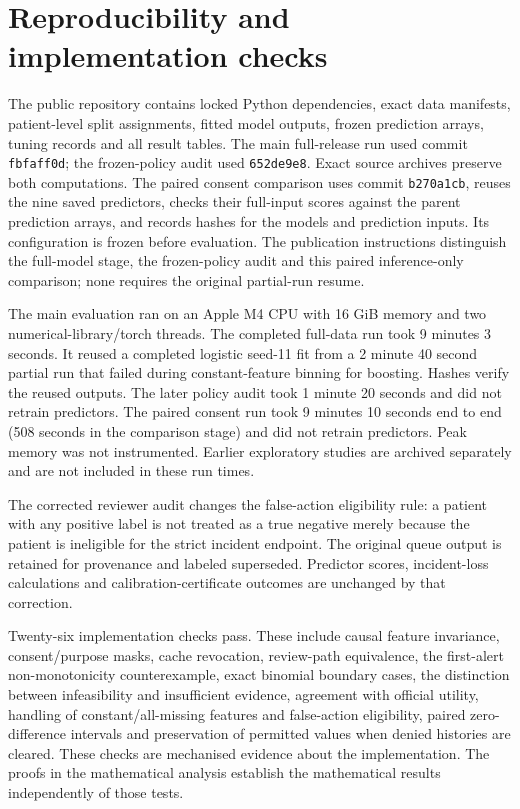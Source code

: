 \section*{Reproducibility and implementation checks}
The public repository contains locked Python dependencies, exact data manifests, patient-level split assignments, fitted model outputs, frozen prediction arrays, tuning records and all result tables. The main full-release run used commit \texttt{fbfaff0d}; the frozen-policy audit used \texttt{652de9e8}. Exact source archives preserve both computations. The paired consent comparison uses commit \texttt{b270a1cb}, reuses the nine saved predictors, checks their full-input scores against the parent prediction arrays, and records hashes for the models and prediction inputs. Its configuration is frozen before evaluation. The publication instructions distinguish the full-model stage, the frozen-policy audit and this paired inference-only comparison; none requires the original partial-run resume.

The main evaluation ran on an Apple M4 CPU with 16 GiB memory and two numerical-library/torch threads. The completed full-data run took 9 minutes 3 seconds. It reused a completed logistic seed-11 fit from a 2 minute 40 second partial run that failed during constant-feature binning for boosting. Hashes verify the reused outputs. The later policy audit took 1 minute 20 seconds and did not retrain predictors. The paired consent run took 9 minutes 10 seconds end to end (508 seconds in the comparison stage) and did not retrain predictors. Peak memory was not instrumented. Earlier exploratory studies are archived separately and are not included in these run times.

The corrected reviewer audit changes the false-action eligibility rule: a patient with any positive label is not treated as a true negative merely because the patient is ineligible for the strict incident endpoint. The original queue output is retained for provenance and labeled superseded. Predictor scores, incident-loss calculations and calibration-certificate outcomes are unchanged by that correction.

Twenty-six implementation checks pass. These include causal feature invariance, consent/purpose masks, cache revocation, review-path equivalence, the first-alert non-monotonicity counterexample, exact binomial boundary cases, the distinction between infeasibility and insufficient evidence, agreement with official utility, handling of constant/all-missing features and false-action eligibility, paired zero-difference intervals and preservation of permitted values when denied histories are cleared. These checks are mechanised evidence about the implementation. The proofs in the mathematical analysis establish the mathematical results independently of those tests.

